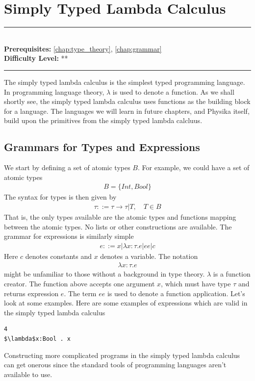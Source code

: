\documentclass[book.tex]{subfiles}
\begin{document}
\chapter{Simply Typed Lambda Calculus}
\label{chap:stlc}
\noindent\rule{11cm}{0.4pt} \\
\textbf{Prerequisites:}  \autoref{chap:type_theory}, \autoref{chap:grammar}   \\
\textbf{Difficulty Level:} ** \\
\noindent\rule{11cm}{0.4pt}
\vspace{5mm}

The simply typed lambda calculus is the simplest typed programming language. In programming language theory, $\lambda$ is used to denote a function. As we shall shortly see, the simply typed lambda calculus uses functions as the building block for a language. The languages we will learn in future chapters, and Physika itself, build upon the primitives from the simply typed lambda calcluus.

\section{Grammars for Types and Expressions}

We start by defining a set of atomic types $B$. For example, we could have a set of atomic types
\begin{align}
B = \{ Int, Bool\}
\end{align} 
The syntax for types is then given by
\begin{align}
\tau ::= \tau \to \tau | T, \quad T \in B
\end{align}
That is, the only types available are the atomic types and functions mapping between the atomic types. No lists or other constructions are available. The grammar for expressions is similarly simple
\begin{align}
e ::= x | \lambda x: \tau . e | e e | c
\end{align}
Here $c$ denotes constants and $x$ denotes a variable. The notation
\begin{align}
\lambda x: \tau. e
\end{align}
might be unfamiliar to those without a background in type theory. $\lambda$ is a function creator. The function above accepts one argument $x$, which must have type $\tau$ and returns expression $e$. The term $e e$ is used to denote a function application. Let's look at some examples. 
Here are some examples of expressions which are valid in the simply typed lambda calculus
\begin{lstlisting}
4
$\lambda$x:Bool . x
\end{lstlisting}
Constructing more complicated programs in the simply typed lambda calculus can get onerous since the standard tools of programming languages aren't available to use.
\end{document}
